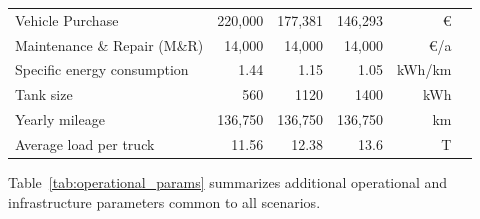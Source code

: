 \begin{table}[H]
{\begin{tabular}{llllrl}
            Vehicle Purchase                   & \multicolumn{1}{r}{220,000}                     &\multicolumn{1}{r}{177,381}                     & \multicolumn{1}{r}{146,293}                    & \euro                    &   \citep{basma2023tco}        \\
            Maintenance \& Repair (M\&R)       & \multicolumn{1}{r}{14,000}                      & \multicolumn{1}{r}{14,000}                      & \multicolumn{1}{r}{14,000}                      & \euro/a                  &       \citep{transportandedecarb2021}    \\
            Specific energy consumption        & \multicolumn{1}{r}{1.44}                        & \multicolumn{1}{r}{1.15}                        & \multicolumn{1}{r}{1.05}                        & kWh/km                   &   \citep{transportandedecarb2021}       \\
            Tank size                          & \multicolumn{1}{r}{560}                         & \multicolumn{1}{r}{1120}                        & \multicolumn{1}{r}{1400}                        & kWh                      &       \citep{transportandedecarb2021}    \\
            Yearly mileage                     & \multicolumn{1}{r}{136,750}                     & \multicolumn{1}{r}{136,750}                     & \multicolumn{1}{r}{136,750}                     & km                       &        \citep{transportandedecarb2021}   \\
            Average load per truck                    & \multicolumn{1}{r}{11.56}                     & \multicolumn{1}{r}{12.38}                     & \multicolumn{1}{r}{13.6}                     & T                       &        \citep{SHOMAN2023103825}   \\
            \hline
            \end{tabular}
            }
            \end{table}

        Table~\ref{tab:operational_params} summarizes additional operational and infrastructure parameters common to all scenarios.

